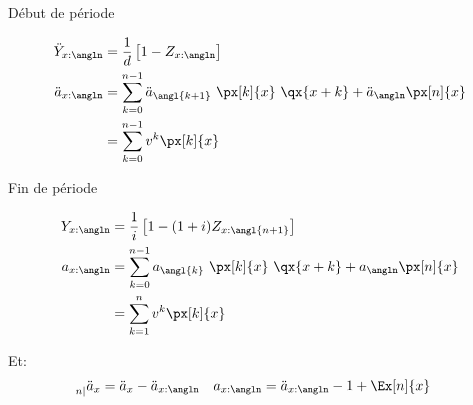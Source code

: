 \documentclass[10pt, french]{article}
\newcommand\cumlaut[2][black]{\stackon[.33ex]{#2}{\textcolor{#1}{\kern-.04ex.\kern-.2ex.}}}
\begin{document}
\begin{multicols*}{3}
\begin{minipage}[t]{0.5\columnwidth}
\begin{center}
Début de période
\end{center}
\begin{align*}
	\ddot{Y}_{x:\angln} 
	&=	\frac{1}{d} \left[ 1 - Z_{x:\angln} \right]	\\
	\ddot{a}_{x:\angln}	
	&=	\sum_{k = 0}^{n - 1} \ddot{a}_{\angl{k + 1}} \ \px[k]{x} \ \qx{x + k}	+	\ddot{a}_{\angln} \px[n]{x}	\\
	&=	\sum_{k = 0}^{n - 1} v^{k} \px[k]{x}
\end{align*}
\end{minipage}
\begin{minipage}[t]{0.5\columnwidth}
\begin{center}
Fin de période
\end{center}
\begin{align*}
	Y_{x:\angln} 
	&=	\frac{1}{i}\left[ 1 - (1 + i) Z_{x:\angl{n + 1}}\right] 	\\
	a_{x:\angln}	
	&=	\sum_{k = 0}^{n - 1} a_{\angl{k}} \ \px[k]{x} \ \qx{x + k}	+	a_{\angln} \px[n]{x}	\\
	&=	\sum_{k = 1}^{n} v^{k} \px[k]{x}
\end{align*}	
\end{minipage}
\setlength{\mathindent}{1cm}

Et:
\begin{align*}
	\prescript{}{n|}{\ddot{a}_{x}}
	&=	\ddot{a}_{x} - \ddot{a}_{x:\angln}	&
	a_{x:\angln}
	&=	\ddot{a}_{x:\angln} - 1 + \Ex[n]{x}
\end{align*}





\end{multicols*}
\end{document}
